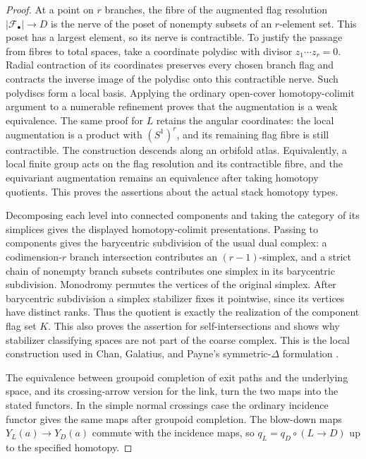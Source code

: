 \begin{proof}
At a point on $r$ branches, the fibre of the augmented flag resolution $|\mathcal F_\bullet|\to D$ is the nerve of the poset of nonempty subsets of an $r$-element set.  This poset has a largest element, so its nerve is contractible.  To justify the passage from fibres to total spaces, take a coordinate polydisc with divisor $z_1\cdots z_r=0$.  Radial contraction of its coordinates preserves every chosen branch flag and contracts the inverse image of the polydisc onto this contractible nerve.  Such polydiscs form a local basis.  Applying the ordinary open-cover homotopy-colimit argument to a numerable refinement proves that the augmentation is a weak equivalence.  The same proof for $L$ retains the angular coordinates: the local augmentation is a product with $(S^1)^r$, and its remaining flag fibre is still contractible.  The construction descends along an orbifold atlas.  Equivalently, a local finite group acts on the flag resolution and its contractible fibre, and the equivariant augmentation remains an equivalence after taking homotopy quotients.  This proves the assertions about the actual stack homotopy types.

Decomposing each level into connected components and taking the category of its simplices gives the displayed homotopy-colimit presentations.  Passing to components gives the barycentric subdivision of the usual dual complex: a codimension-$r$ branch intersection contributes an $(r-1)$-simplex, and a strict chain of nonempty branch subsets contributes one simplex in its barycentric subdivision.  Monodromy permutes the vertices of the original simplex.  After barycentric subdivision a simplex stabilizer fixes it pointwise, since its vertices have distinct ranks.  Thus the quotient is exactly the realization of the component flag set $K$.  This also proves the assertion for self-intersections and shows why stabilizer classifying spaces are not part of the coarse complex.  This is the local construction used in Chan, Galatius, and Payne's symmetric-$\Delta$ formulation \cite[\S5.2, Lemma~5.4 and Corollary~5.6]{CGP2021}.

The equivalence between groupoid completion of exit paths and the underlying space, and its crossing-arrow version for the link, turn the two maps into the stated functors.  In the simple normal crossings case the ordinary incidence functor gives the same maps after groupoid completion.  The blow-down maps $Y_L(a)\to Y_D(a)$ commute with the incidence maps, so $q_L=q_D\circ(L\to D)$ up to the specified homotopy.


\end{proof}
